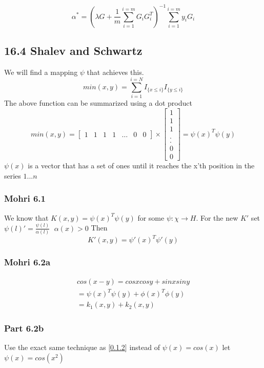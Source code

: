 $$
    \alpha^* = \left( {\lambda}G  + \frac{1}{m} \sum_{i = 1}^{i = m} G_i G_i^T\right)^{-1} \sum_{i = 1}^{i=m}y_i G_i 
$$


\subsection{16.4 Shalev and Schwartz}
We will find a mapping $\psi$ that achieves this.
$$
min(x, y)  = \sum_{i = 1}^{i = N} I_{\{x \leq i\}} I_{\{y \leq i\}}
$$
The above function can be summarized using a dot product
$$
    min(x,y) = \begin{bmatrix} 1 & 1 & 1 & 1 & \ldots & 0 & 0 
    \end{bmatrix} \times \begin{bmatrix} 1 \\ 1 \\ 1\\ \\ . \\. \\ 0  \\ 0\end{bmatrix} = \psi(x)^T \psi(y)
$$
$\psi(x)$ is a vector that has a set of ones until it reaches the x'th position in the series $1 ... n$

\subsubsection{Mohri 6.1}
We know that $K(x, y) = \psi(x)^T \psi(y)$ for some $\psi : \chi \rightarrow  H$.
For the new $K'$ set $\psi(l)' = \frac{\psi(l)}{\alpha(l)}  \ \  \,\alpha(x) > 0 $
Then 
$$
K'(x, y) = \psi'(x)^T \psi'(y)
$$
\subsubsection{Mohri 6.2a}
\label{part_a}

\begin{gather}
    cos(x - y) = cosx cos y  + sinx sin y \\
                = \psi(x)^T \psi(y) + \phi(x)^T \phi(y)\\
                 = k_1(x, y) + k_2(x, y)
\end{gather}

\subsubsection{Part 6.2b}
Use the exact same technique as [\ref{part_a}]  instead of $\psi(x) = cos(x)$ let $\psi(x) = cos(x^2) $
